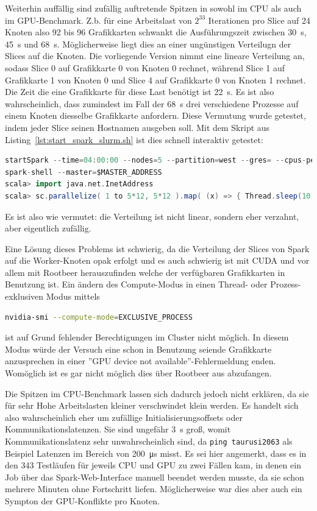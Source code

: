 Weiterhin auffällig sind zufällig auftretende Spitzen in sowohl im CPU als auch im GPU-Benchmark. Z.b. für eine Arbeitslast von $2^33$ Iterationen pro Slice auf 24 Knoten also 92 bis 96 Grafikkarten schwankt die Ausführungszeit zwischen \SI{30}{\second}, \SI{45}{\second} und \SI{68}{\second}. Möglicherweise liegt dies an einer ungünstigen Verteilugn der Slices auf die Knoten. Die vorliegende Version nimmt eine lineare Verteilung an, sodass Slice 0 auf Grafikkarte 0 von Knoten 0 rechnet, während Slice 1 auf Grafikkarte 1 von Knoten 0 und Slice 4 auf Grafikkarte 0 von Knoten 1 rechnet. Die Zeit die eine Grafikkarte für diese Last benötigt ist \SI{22}{\second}. Es ist also wahrscheinlich, dass zumindest im Fall der \SI{68}{\second} drei verschiedene Prozesse auf einem Knoten diesselbe Grafikkarte anfordern. Diese Vermutung wurde getestet, indem jeder Slice seinen Hostnamen ausgeben soll. Mit dem Skript aus Listing~\ref{lst:start_spark_slurm.sh} ist dies schnell interaktiv getestet:
\begin{lstlisting}[language=scala]
startSpark --time=04:00:00 --nodes=5 --partition=west --gres= --cpus-per-task=12
spark-shell --master=$MASTER_ADDRESS
scala> import java.net.InetAddress
scala> sc.parallelize( 1 to 5*12, 5*12 ).map( (x) => { Thread.sleep(10); x+" : "+InetAddress.getLocalHost().getHostName() } ).collect().foreach( println )
\end{lstlisting}\vspace{-1.5\baselineskip}
Es ist also wie vermutet: die Verteilung ist nicht linear, sondern eher verzahnt, aber eigentlich zufällig.

Eine Lösung dieses Problems ist schwierig, da die Verteilung der Slices von Spark auf die Worker-Knoten opak erfolgt und es auch schwierig ist mit CUDA und vor allem mit Rootbeer herauszufinden welche der verfügbaren Grafikkarten in Benutzung ist. Ein ändern des Compute-Modus in einen Thread- oder Prozess-exklusiven Modus mittels
\begin{lstlisting}[language=bash]
nvidia-smi --compute-mode=EXCLUSIVE_PROCESS
\end{lstlisting}
ist auf Grund fehlender Berechtigungen im Cluster nicht möglich. In diesem Modus würde der Versuch eine schon in Benutzung seiende Grafikkarte anzusprechen in einer ''GPU device not available''-Fehlermeldung enden. Womöglich ist es gar nicht möglich dies über Rootbeer aus abzufangen.

Die Spitzen im CPU-Benchmark lassen sich dadurch jedoch nicht erklären, da sie für sehr Hohe Arbeitslasten kleiner verschwindet klein werden. Es handelt sich also wahrscheinlich eher um zufällige Initialisierungsoffsets oder Kommunikationslatenzen. Sie sind ungefähr \SI{3}{\second} groß, womit Kommunikationslatenz sehr unwahrscheinlich sind, da \lstinline!ping taurusi2063! als Beispiel Latenzen im Bereich von \SI{200}{\micro\second} misst. Es sei hier angemerkt, dass es in den 343 Testläufen für jeweils CPU und GPU zu zwei Fällen kam, in denen ein Job über das Spark-Web-Interface manuell beendet werden musste, da sie schon mehrere Minuten ohne Fortschritt liefen. Möglicherweise war dies aber auch ein Sympton der GPU-Konflikte pro Knoten.

